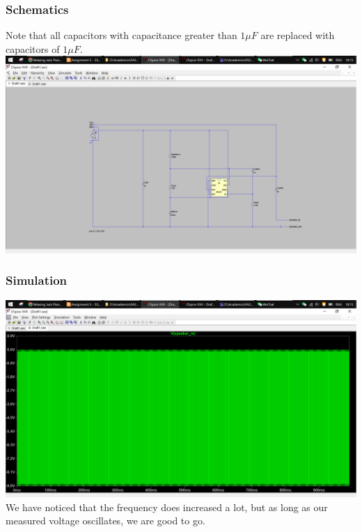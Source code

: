 \documentclass{article}
\begin{document}
	\subsubsection{Schematics}
	Note that all capacitors with capacitance greater than $ 1\mu F $ are replaced with capacitors of $ 1\mu F $.\newline
	\includegraphics[width=\columnwidth]{LTSP_BREA_SCHE}
	\subsubsection{Simulation}
	\includegraphics[width=\columnwidth]{LTSP_BREA_SIMU}
	We have noticed that the frequency does increased a lot, but as long as our measured voltage oscillates, we are good to go.
\end{document}
